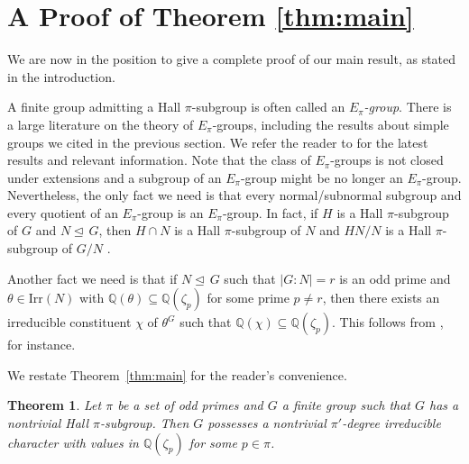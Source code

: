 \documentclass[12pt]{amsart}
\newtheorem{theorem}{Theorem}[section]
\theoremstyle{definition}
\numberwithin{equation}{section}
\newcommand{\Irr}{{\mathrm {Irr}}}
\newcommand{\QQ}{{\mathbb Q}}
\def\nor{\trianglelefteq\,}
\begin{document}
\section{A Proof of Theorem \ref{thm:main}}

We are now in the position to give a complete proof of our main result, as stated in the introduction.

A finite group admitting a Hall $\pi$-subgroup is often called an
\emph{$E_\pi$-group}. There is a large literature on the theory of
$E_\pi$-groups, including the results about simple groups we cited in
the previous section. We refer the reader to \cite{RV10} for the
latest results and relevant information. Note that the class of
$E_\pi$-groups is not closed under extensions and a subgroup of an
$E_\pi$-group might be no longer an $E_\pi$-group. Nevertheless, the
only fact we need is that every normal/subnormal subgroup and every
quotient of an $E_\pi$-group is an $E_\pi$-group. In fact, if $H$ is
a Hall $\pi$-subgroup of $G$ and $N\nor G$, then $H\cap N$ is a Hall
$\pi$-subgroup of $N$ %
and $HN/N$ is %
a Hall $\pi$-subgroup of %
$G/N$%
.


Another fact we need is that if $N\nor G$ such that $|G:N|=r$ is an
odd prime and $\theta\in \Irr(N)$ with $\QQ(\theta)\subseteq
\QQ(\zeta_p)$ for some prime $p\neq r$, %
then there exists an
irreducible constituent $\chi$ of $\theta^G$ such that
$\QQ(\chi)\subseteq \QQ(\zeta_p)$. This follows from
\cite[Lemma~2.2]{GHSV21}, for instance.

We restate Theorem~\ref{thm:main} for the reader's convenience.

\begin{theorem}
Let $\pi$ be a set of odd primes and $G$ a finite group such that
$G$ has a nontrivial Hall $\pi$-subgroup. Then $G$ possesses a
nontrivial $\pi'$-degree irreducible character with values %
in
$\QQ(\zeta_p)$ for %
some $p\in\pi$.
\end{theorem}
\end{document}
